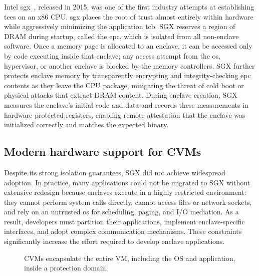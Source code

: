 Intel \gls{sgx}~\cite{costan_intel_2016}, released in 2015, was one of the first industry attempts at establishing \glspl{tee} on an x86 CPU.
\gls{sgx} places the root of trust almost entirely within hardware while aggressively minimizing the application \gls{tcb}.
SGX reserves a region of DRAM during startup, called the \gls{epc}, which is isolated from all non-enclave software.
Once a memory page is allocated to an enclave, it can be accessed only by code executing inside that enclave; any access attempt from the \gls{os}, hypervisor, or another enclave is blocked by the memory controllers.
SGX further protects enclave memory by transparently encrypting and integrity-checking \gls{epc} contents as they leave the CPU package, mitigating the threat of cold boot \cite{coldboot-attack} or physical attacks that extract DRAM content.
During enclave creation, SGX measures the enclave's initial code and data and records these measurements in hardware-protected registers, enabling remote attestation that the enclave was initialized correctly and matches the expected binary.







\subsection{Modern hardware support for CVMs}

Despite its strong isolation guarantees, SGX did not achieve widespread adoption.
In practice, many applications could not be migrated to SGX without extensive redesign because enclaves execute in a highly restricted environment: they cannot perform system calls directly, cannot access files or network sockets, and rely on an untrusted \gls{os} for scheduling, paging, and I/O mediation.
As a result, developers must partition their applications, implement enclave-specific interfaces, and adopt complex communication mechanisms.
These constraints significantly increase the effort required to develop enclave applications.

\begin{figure}[t]
	\centering
	
	\caption{CVMs encapsulate the entire VM, including the OS and application, inside a protection domain.}\label{cvm}
\end{figure}


